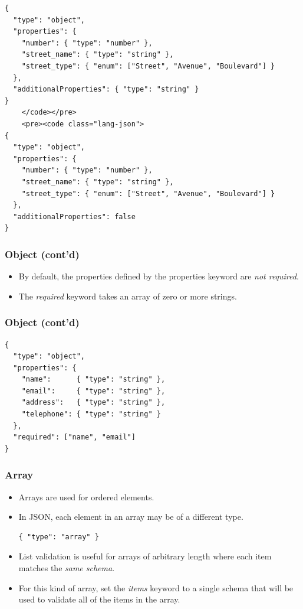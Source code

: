 \documentclass{efd-lecture}
\begin{document}
\begin{frame}[fragile]
  \scriptsize
  \begin{verbatim}
{
  "type": "object",
  "properties": {
    "number": { "type": "number" },
    "street_name": { "type": "string" },
    "street_type": { "enum": ["Street", "Avenue", "Boulevard"] }
  },
  "additionalProperties": { "type": "string" }
}
    </code></pre>
    <pre><code class="lang-json">
{
  "type": "object",
  "properties": {
    "number": { "type": "number" },
    "street_name": { "type": "string" },
    "street_type": { "enum": ["Street", "Avenue", "Boulevard"] }
  },
  "additionalProperties": false
}
  \end{verbatim}
\end{frame}

\begin{frame}
  \frametitle{Object (cont'd)}
  \begin{itemize}
    \item
      By default, the properties defined by the properties keyword are
      \textit{\color{RubineRed}not required}.
    \item
      The \textit{\color{YellowOrange}required} keyword takes an array of
      zero or more strings.
  \end{itemize}
\end{frame}

\begin{frame}[fragile]
  \frametitle{Object (cont'd)}
  \begin{verbatim}
{
  "type": "object",
  "properties": {
    "name":      { "type": "string" },
    "email":     { "type": "string" },
    "address":   { "type": "string" },
    "telephone": { "type": "string" }
  },
  "required": ["name", "email"]
}
  \end{verbatim}
\end{frame}

\begin{frame}[fragile]
  \frametitle{Array}
  \begin{itemize}
    \item Arrays are used for ordered elements.
    \item In JSON, each element in an array may be of a different type.
    \begin{verbatim}
{ "type": "array" }
    \end{verbatim}
    \item
      List validation is useful for arrays of arbitrary length where each item
      matches the \textit{\color{Yellow} same schema}.
    \item
      For this kind of array, set the
      \textit{\color{YellowOrange} items} keyword to a single schema that
      will be used to validate all of the items in the array.
  \end{itemize}
\end{frame}
\end{document}
